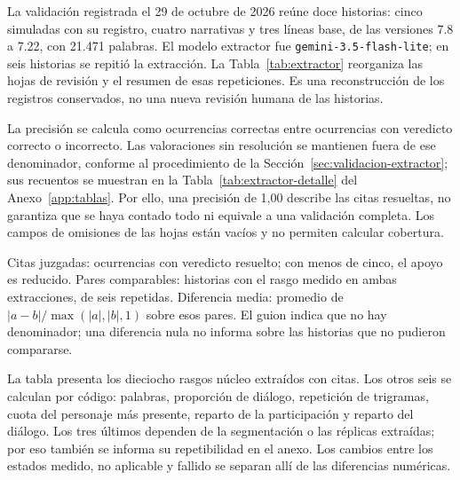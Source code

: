La validación registrada el 29 de octubre de 2026 reúne doce historias: cinco simuladas con su
registro, cuatro narrativas y tres líneas base, de las versiones 7.8 a 7.22, con 21.471 palabras.
El modelo extractor fue \texttt{gemini-3.5-flash-lite}; en seis historias se repitió la extracción.
La Tabla~\ref{tab:extractor} reorganiza las hojas de revisión y el resumen de esas repeticiones.
Es una reconstrucción de los registros conservados, no una nueva revisión humana de las historias.

La precisión se calcula como ocurrencias correctas entre ocurrencias con veredicto correcto o
incorrecto. Las valoraciones sin resolución se mantienen fuera de ese denominador, conforme al
procedimiento de la Sección~\ref{sec:validacion-extractor}; sus recuentos se muestran en la
Tabla~\ref{tab:extractor-detalle} del Anexo~\ref{app:tablas}. Por ello, una precisión de 1,00 describe
las citas resueltas, no garantiza que se haya contado todo ni equivale a una validación completa.
Los campos de omisiones de las hojas están vacíos y no permiten calcular cobertura.

\begin{table}[p]
  \centering
  \caption{Validación registrada del extractor: citas y repetición (12 historias, 2026-10-29)}
  \label{tab:extractor}
  \small
  \setlength{\tabcolsep}{5pt}
  
  \par\medskip
  \begin{minipage}{0.94\textwidth}
    \footnotesize
    Citas juzgadas: ocurrencias con veredicto resuelto; con menos de cinco, el apoyo es reducido.
    Pares comparables: historias con el rasgo medido en ambas extracciones, de seis repetidas.
    Diferencia media: promedio de $|a-b|/\max(|a|,|b|,1)$ sobre esos pares.
    El guion indica que no hay denominador; una diferencia nula no informa sobre las historias
    que no pudieron compararse.
  \end{minipage}
\end{table}

La tabla presenta los dieciocho rasgos núcleo extraídos con citas. Los otros seis se calculan por
código: palabras, proporción de diálogo, repetición de trigramas, cuota del personaje más presente,
reparto de la participación y reparto del diálogo. Los tres últimos dependen de la segmentación o
las réplicas extraídas; por eso también se informa su repetibilidad en el anexo. Los cambios entre
los estados medido, no aplicable y fallido se separan allí de las diferencias numéricas.

